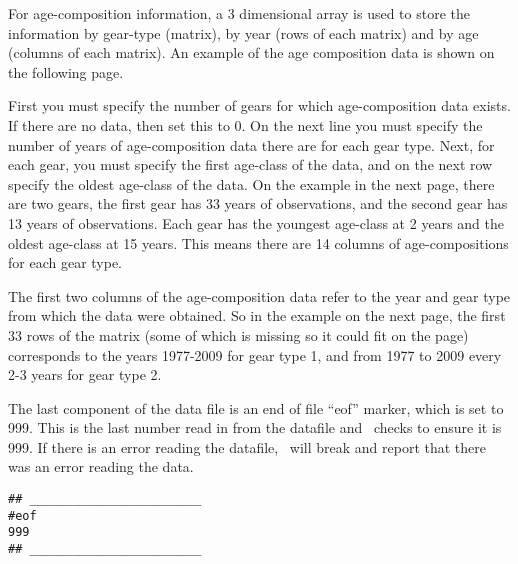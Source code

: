 \begin{multicols}{2}
For age-composition information, a 3 dimensional array is used to store the information by gear-type (matrix), by year (rows of each matrix) and by age (columns of each matrix).  An example of the age composition data is shown on the following page.  

First you must specify the number of gears for which age-composition data exists.  If there are no data, then set this to 0. On  the next line you must specify the number of years of age-composition data there are for each gear type.  Next, for each gear, you must specify the first age-class of the data, and on the next row specify the oldest age-class of the data.  On the example in the next page, there are two gears, the first gear has 33 years of observations, and the second gear has 13 years of observations.  Each gear has the youngest age-class at 2 years and the oldest age-class at 15 years.  This means there are 14 columns of age-compositions for each gear type.  

The first two columns of the age-composition data refer to the year and gear type from which the data were obtained.  So in the example on the next page, the first 33 rows of the matrix (some of which is missing so it could fit on the page) corresponds to the years 1977-2009 for gear type 1, and from 1977 to 2009 every 2-3 years for gear type 2.  

The last component of the data file is an end of file ``eof'' marker, which is set to 999.  This is the last number read in from the datafile and \iscam\ checks to ensure it is 999.  If there is an error reading the datafile, \iscam\ will break and report that there was an error reading the data.


\begin{verbatim}
## ________________________
#eof
999
## ________________________
\end{verbatim}

\end{multicols}
